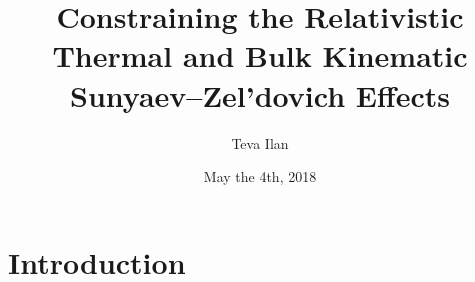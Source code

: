 \documentclass{princeton_astro_thesis}
\author{Teva Ilan}
\title{Constraining the Relativistic Thermal and Bulk Kinematic Sunyaev--Zel'dovich Effects}
\date{May the 4th, 2018}
\begin{document}
\chapter{Introduction}

\end{document}

